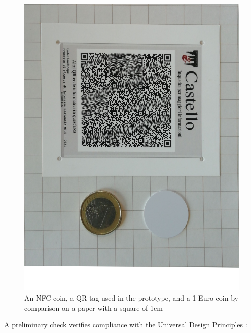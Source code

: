 \documentclass[sustainability,article,submit,pdftex,moreauthors]{Definitions/mdpi}
\begin{document}
\begin{figure}
	\centering
	\includegraphics[width=0.9\linewidth]{figure/qr+NFC+coin}
	\caption[Passive devices dimensions]{An NFC coin, a QR tag used in the prototype, and a 1 Euro coin by comparison on a paper with a square of 1cm}
	\label{fig:qrnfccoin}
\end{figure}

A preliminary check verifies compliance with the Universal Design Principles \cite{udi97a}:
\end{document}
